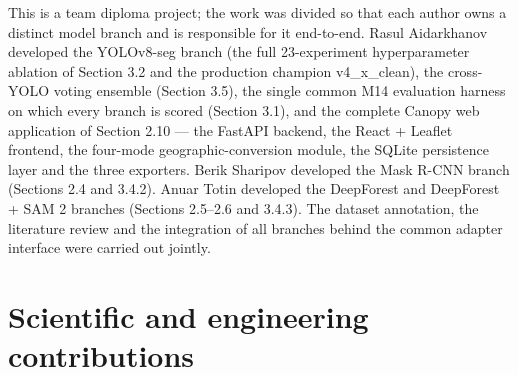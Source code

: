 This is a team diploma project; the work was divided so that each author owns a distinct model branch and is responsible for it end-to-end. Rasul Aidarkhanov developed the YOLOv8-seg branch (the full 23-experiment hyperparameter ablation of Section 3.2 and the production champion v4\_x\_clean), the cross-YOLO voting ensemble (Section 3.5), the single common M14 evaluation harness on which every branch is scored (Section 3.1), and the complete Canopy web application of Section 2.10 --- the FastAPI backend, the React + Leaflet frontend, the four-mode geographic-conversion module, the SQLite persistence layer and the three exporters. Berik Sharipov developed the Mask R-CNN branch (Sections 2.4 and 3.4.2). Anuar Totin developed the DeepForest and DeepForest + SAM 2 branches (Sections 2.5--2.6 and 3.4.3). The dataset annotation, the literature review and the integration of all branches behind the common adapter interface were carried out jointly.

\section{Scientific and engineering contributions}\label{scientific-and-engineering-contributions}

